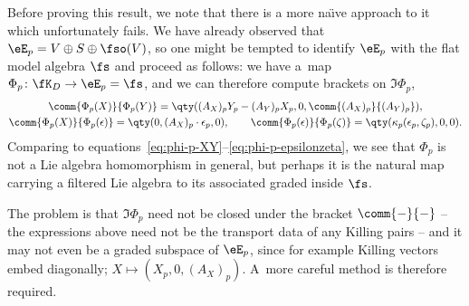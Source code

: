 \begin{Remark}
Before proving this result, we note that there is a more na\"{\i}ve approach to it which unfortunately fails. We have already observed that $\eE_p = V\oplus S\oplus\fso(V)$, so one might be tempted to identify $\eE_p$ with the flat model algebra $\fs$ and proceed as follows: we have a~map~${\Phi_p\colon \fK_D\to \eE_p=\fs}$, and we can therefore compute brackets on $\Im\Phi_p$,
\begin{gather*}
	\comm{\Phi_p(X)}{\Phi_p(Y)}
		= \qty((A_X)_p Y_p - (A_Y)_p X_p,0,\comm{(A_X)_p}{(A_Y)_p}),\\
	\comm{\Phi_p(X)}{\Phi_p(\epsilon)}
		= \qty(0,(A_X)_p\cdot\epsilon_p,0),\qquad
	\comm{\Phi_p(\epsilon)}{\Phi_p(\zeta)}
		= \qty(\kappa_p(\epsilon_p,\zeta_p),0,0).
\end{gather*}
Comparing to equations~\eqref{eq:phi-p-XY}--\eqref{eq:phi-p-epsilonzeta}, we see that $\Phi_p$ is not a Lie algebra homomorphism in general, but perhaps it is the natural map carrying a filtered Lie algebra to its associated graded inside $\fs$.

The problem is that $\Im\Phi_p$ need not be closed under the bracket $\comm{-}{-}$ -- the expressions above need not be the transport data of any Killing pairs -- and it may not even be a graded subspace of $\eE_p$, since for example Killing vectors embed diagonally; $X\mapsto(X_p,0,(A_X)_p)$. A~more careful method is therefore required.
\end{Remark}

